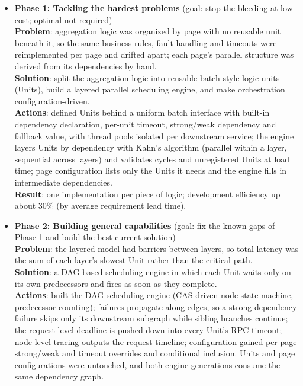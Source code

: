 \documentclass{resume}
\begin{document}
\begin{itemize}
    \item \textbf{Phase 1: Tackling the hardest problems} (goal: stop the bleeding at low cost; optimal not required)\\
    \textbf{Problem}: aggregation logic was organized by page with no reusable unit beneath it, so the same business rules, fault handling and timeouts were reimplemented per page and drifted apart; each page's parallel structure was derived from its dependencies by hand.\\
    \textbf{Solution}: split the aggregation logic into reusable batch-style logic units (Units), build a layered parallel scheduling engine, and make orchestration configuration-driven.\\
    \textbf{Actions}: defined Units behind a uniform batch interface with built-in dependency declaration, per-unit timeout, strong/weak dependency and fallback value, with thread pools isolated per downstream service; the engine layers Units by dependency with Kahn's algorithm (parallel within a layer, sequential across layers) and validates cycles and unregistered Units at load time; page configuration lists only the Units it needs and the engine fills in intermediate dependencies.\\
    \textbf{Result}: one implementation per piece of logic; development efficiency up about 30\% (by average requirement lead time).
    \item \textbf{Phase 2: Building general capabilities} (goal: fix the known gaps of Phase 1 and build the best current solution)\\
    \textbf{Problem}: the layered model had barriers between layers, so total latency was the sum of each layer's slowest Unit rather than the critical path.\\
    \textbf{Solution}: a DAG-based scheduling engine in which each Unit waits only on its own predecessors and fires as soon as they complete.\\
    \textbf{Actions}: built the DAG scheduling engine (CAS-driven node state machine, predecessor counting); failures propagate along edges, so a strong-dependency failure skips only its downstream subgraph while sibling branches continue; the request-level deadline is pushed down into every Unit's RPC timeout; node-level tracing outputs the request timeline; configuration gained per-page strong/weak and timeout overrides and conditional inclusion. Units and page configurations were untouched, and both engine generations consume the same dependency graph.\\

\end{itemize}
\end{document}
